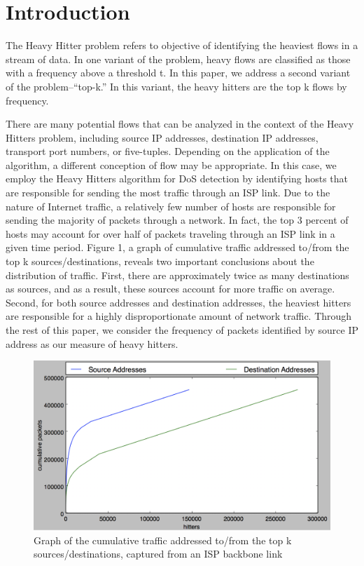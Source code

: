\section{Introduction}
\label{sec:intro}
The Heavy Hitter problem refers to objective of identifying the heaviest flows in a stream of data. In one variant of the problem, heavy flows are classified as those with a frequency above a threshold t. In this paper, we address a second variant of the problem--``top-k.'' In this variant, the heavy hitters are the top k flows by frequency. 

There are many potential flows that can be analyzed in the context of the Heavy Hitters problem, including source IP addresses, destination IP addresses, transport port numbers, or five-tuples. Depending on the application of the algorithm, a different conception of flow may be appropriate. In this case, we employ the Heavy Hitters algorithm for DoS detection by identifying hosts that are responsible for sending the most traffic through an ISP link. Due to the nature of Internet traffic, a relatively few number of hosts are responsible for sending the majority of packets through a network. In fact, the top 3 percent of hosts may account for over half of packets traveling through an ISP link in a given time period. Figure 1, a graph of cumulative traffic addressed to/from the top k sources/destinations, reveals two important conclusions about the distribution of traffic. First, there are approximately twice as many destinations as sources, and as a result, these sources account for more traffic on average. Second, for both source addresses and destination addresses, the heaviest hitters are responsible for a highly disproportionate amount of network traffic. Through the rest of this paper, we consider the frequency of packets identified by source IP address as our measure of heavy hitters.

\begin{figure}[t]
  \centering
    \includegraphics[scale=0.3]{cumulative}
     \caption{Graph of the cumulative traffic addressed to/from the top k sources/destinations, captured from an ISP backbone link}
     \label{fig:bp-image}
\end{figure}

